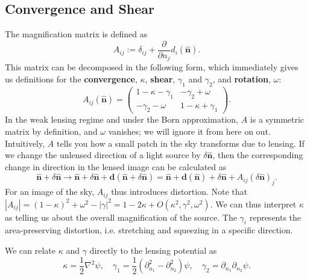 \documentclass[11pt]{article} %
\begin{document}
\subsection{Convergence and Shear}
The magnification matrix is defined as
\begin{equation}
    A_{ij} := \delta_{ij} + \frac{\partial}{\partial n_j}d_i(\hat{\mathbf n}).
\end{equation}
This matrix can be decomposed in the following form, which immediately gives us definitions for the \textbf{convergence}, $\kappa$, \textbf{shear}, $\gamma_1$ and $\gamma_2$, and \textbf{rotation}, $\omega$:
\begin{equation}
    A_{ij}(\hat{\mathbf n}) = \begin{pmatrix}
        1 - \kappa - \gamma_1 & -\gamma_2 + \omega \\
        -\gamma_2 - \omega & 1 - \kappa + \gamma_1
    \end{pmatrix}.
\end{equation}
In the weak lensing regime and under the Born approximation, $A$ is a symmetric matrix by definition, and $\omega$ vanishes; we will ignore it from here on out. Intuitively, $A$ tells you how a small patch in the sky transforms due to lensing. If we change the unlensed direction of a light source by $\delta\hat{\mathbf n}$, then the corresponding change in direction in the lensed image can be calculated as
\begin{equation}
\hat{\mathbf{n}} + \delta \hat{\mathbf{n}} \rightarrow \hat{\mathbf{n}} + \delta \hat{\mathbf{n}} + \mathbf d (\hat{\mathbf{n}} + \delta \hat{\mathbf{n}}) = \hat{\mathbf{n}} + \mathbf d (\hat{\mathbf n}) + \delta \hat{\mathbf n} + A_{ij}(\delta \hat{\mathbf{n}})_j.
\end{equation}
For an image of the sky, $A_{ij}$ thus introduces distortion. Note that $|A_{ij}| = (1 - \kappa)^2 + \omega^2 - |\gamma|^2 = 1 - 2\kappa + O(\kappa^2, \gamma^2, \omega^2)$. We can thus interpret $\kappa$ as telling us about the overall magnification of the source. The $\gamma_i$ represents the area-preserving distortion, i.e. stretching and squeezing in a specific direction.

We can relate $\kappa$ and $\gamma$ directly to the lensing potential as
\begin{equation}
    \kappa = \frac{1}{2}\nabla^2\psi, \quad \gamma_1 = \frac{1}{2}(\partial_{n_1}^2 - \partial_{n_2}^2)\psi, \quad \gamma_2 = \partial_{n_1}\partial_{n_2} \psi.
\end{equation}
\end{document}

